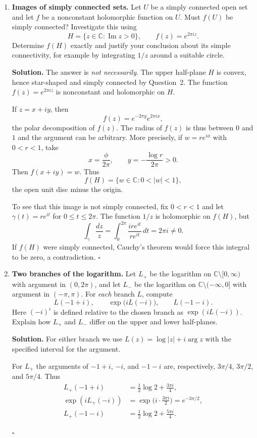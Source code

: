 \documentclass[12pt,reqno]{amsart}
\newcommand{\C}{\mathbb{C}}
\newenvironment{solution}
  {\par\smallskip\begin{tcolorbox}[breakable,enhanced,colback=solblue,colframe=solframe,
   boxrule=0.5pt,arc=2pt,left=6pt,right=6pt,top=4pt,bottom=4pt]\noindent\textbf{Solution.}}
  {\hfill$\square$\end{tcolorbox}\par\medskip}
\begin{document}
\begin{enumerate}
\item \textbf{Images of simply connected sets.}
Let $U$ be a simply connected open set and let $f$ be a nonconstant
holomorphic function on $U$. Must $f(U)$ be simply connected?
Investigate this using
\[
 H=\{z\in\C:\operatorname{Im}z>0\},\qquad f(z)=e^{2\pi i z}.
\]
Determine $f(H)$ exactly and justify your conclusion about its simple
connectivity, for example by integrating $1/z$ around a suitable circle.

\begin{solution}
The answer is \emph{not necessarily}. The upper half-plane $H$ is
convex, hence star-shaped and simply connected by Question~2.
The function $f(z)=e^{2\pi iz}$ is nonconstant and holomorphic on $H$.

If $z=x+iy$, then
\[
f(z)=e^{-2\pi y}e^{2\pi ix},
\]
the polar decomposition of $f(z)$. The radius of $f(z)$ is thus
between $0$ and $1$ and the argument can be arbitrary. More precisely,
if $w=re^{i\phi}$ with $0<r<1$, take
\[
x=\frac{\phi}{2\pi},\qquad y=-\frac{\log r}{2\pi}>0.
\]
Then $f(x+iy)=w$. Thus
\[
\boxed{f(H)=\{w\in\C:0<|w|<1\},}
\]
the open unit disc minus the origin.

To see that this image is not simply connected, fix $0<r<1$ and
let $\gamma(t)=re^{it}$ for $0\leq t\leq2\pi$. The function $1/z$
is holomorphic on $f(H)$, but
\[
\int_\gamma\frac{dz}{z}
 =\int_0^{2\pi}\frac{ire^{it}}{re^{it}}\,dt=2\pi i\neq0.
\]
If $f(H)$ were simply connected, Cauchy's theorem would force this
integral to be zero, a contradiction.
\end{solution}

\newpage
\item \textbf{Two branches of the logarithm.}
Let $L_+$ be the logarithm on $\C\setminus[0,\infty)$ with argument
in $(0,2\pi)$, and let $L_-$ be the logarithm on
$\C\setminus(-\infty,0]$ with argument in $(-\pi,\pi)$.
For \emph{each} branch $L$, compute
\[
 L(-1+i),\qquad \exp\bigl(iL(-i)\bigr),\qquad L(-1-i).
\]
Here $(-i)^i$ is defined relative to the chosen branch as
$\exp(iL(-i))$. Explain how $L_+$ and $L_-$ differ on the upper and
lower half-planes.

\begin{solution}
For either branch we use $L(z)=\log|z|+i\arg z$ with the specified
interval for the argument.

\medskip
\noindent For $L_+$ the arguments of $-1+i$, $-i$, and $-1-i$ are,
respectively, $3\pi/4$, $3\pi/2$, and $5\pi/4$. Thus
\begin{align*}
 L_+(-1+i)&=\tfrac12\log2+\tfrac{3\pi i}{4},\\
 \exp(iL_+(-i))&=\exp\bigl(i\cdot\tfrac{3\pi i}{2}\bigr)
                  =e^{-3\pi/2},\\
 L_+(-1-i)&=\tfrac12\log2+\tfrac{5\pi i}{4}.
\end{align*}


\end{solution}
\end{enumerate}
\end{document}
